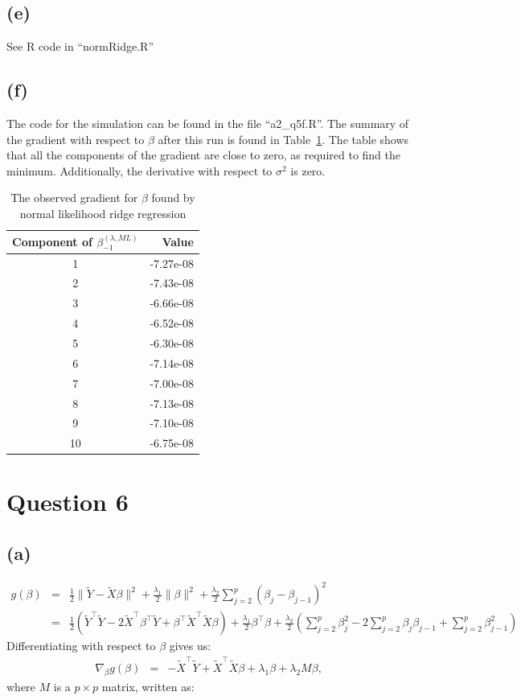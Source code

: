 \documentclass{article}\usepackage[]{graphicx}\usepackage[]{color}
\begin{document}
\subsection*{(e)}
See R code in ``normRidge.R''

\subsection*{(f)}
The code for the simulation can be found in the file ``a2\_q5f.R''.  The summary of the gradient with respect to $\beta$ after this run is found in Table~\ref{tab:normridge}.  The table shows that all the components of the gradient are close to zero, as required to find the minimum.  Additionally, the derivative with respect to $\sigma^2$ is zero.

\begin{table}[ht]
\centering
\begin{tabular}{|c|r|}
  \hline
 Component of $\beta^{(\lambda,ML)}_{-1}$ & Value \\ 
  \hline
  \hline
1 & -7.27e-08 \\ 
  2 & -7.43e-08 \\ 
  3 & -6.66e-08 \\ 
  4 & -6.52e-08 \\ 
  5 & -6.30e-08 \\ 
  6 & -7.14e-08 \\ 
  7 & -7.00e-08 \\ 
  8 & -7.13e-08 \\ 
  9 & -7.10e-08 \\ 
  10 & -6.75e-08 \\ 
   \hline
\end{tabular}
\caption{The observed gradient for $\beta$ found by normal likelihood ridge regression}
\label{tab:normridge}
\end{table}

\section*{Question 6}
\subsection*{(a)}
\begin{eqnarray*}
  g(\beta) &=& \frac{1}{2}\|\tilde{Y}-\tilde{X}\beta\|^2 + \frac{\lambda_1}{2} \|\beta\|^2 + \frac{\lambda_2}{2} \sum_{j=2}^{p} \left( \beta_j - \beta_{j-1} \right)^2 \\
  &=& \frac{1}{2}\left(\tilde{Y}^\top\tilde{Y}-2\tilde{X}^\top\beta^\top\tilde{Y}+\beta^\top\tilde{X}^\top\tilde{X}\beta\right) + \frac{\lambda_1}{2} \beta^\top\beta + \frac{\lambda_2}{2} \left( \sum_{j=2}^p \beta_j^2 - 2\sum_{j=2}^p \beta_j\beta_{j-1} + \sum_{j=2}^p \beta_{j-1}^2  \right)
\end{eqnarray*}
Differentiating with respect to $\beta$ gives us:
\begin{eqnarray*}
  \nabla_\beta g(\beta) &=& -\tilde{X}^\top\tilde{Y} + \tilde{X}^\top\tilde{X}\beta + \lambda_1\beta + \lambda_2 M \beta,
\end{eqnarray*}
where $M$ is a $p \times p$ matrix, written as:
\end{document}
